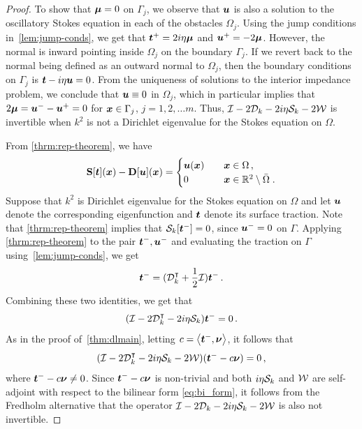 \begin{proof}
To show that ${\boldsymbol \mu}=0$ on
$\Gamma_{j}$, we observe that ${\boldsymbol u}$ is also a
solution to the oscillatory Stokes equation in each
of the obstacles $\Omega_{j}$.
Using the jump conditions in~\cref{lem:jump-conds},
we get that ${\boldsymbol t}^{+} = 2i\eta {\boldsymbol \mu}$ and ${\boldsymbol u}^{+} = -2{\boldsymbol \mu}$.
However, the normal is inward pointing inside $\Omega_{j}$
on the boundary $\Gamma_{j}$. 
If we revert back to the normal being defined as 
an outward normal to $\Omega_{j}$, then
the boundary conditions on $\Gamma_{j}$ 
is ${\boldsymbol t} - i \eta {\boldsymbol u} = 0$. 
From the uniqueness of solutions to the interior 
impedance problem, we conclude that ${\boldsymbol u} \equiv 0$
in $\Omega_{j}$, which in particular implies
that $2{\boldsymbol \mu} = {\boldsymbol u}^{-}-{\boldsymbol u}^{+} = 0$ for ${\boldsymbol x} \in \Gamma_{j}$,
$j=1,2,\ldots m$.
Thus, $\mathcal I - 2{\mathcal D}_{k} -2i\eta{\mathcal S}_{k} -2{\mathcal W}$ is
invertible when $k^2$ is not a Dirichlet eigenvalue
for the Stokes equation on $\Omega$.

From \cref{thrm:rep-theorem}, we have 
\begin{equation} 
  {\bf S} [{\boldsymbol t}]({\boldsymbol x}) - {\bf D}[{\boldsymbol u}]({\boldsymbol x}) = \begin{cases} 
    {\boldsymbol u}({\boldsymbol x}) &\quad {\boldsymbol x} \in \Omega \, , \\
    0 &\quad {\boldsymbol x} \in \mathbb{R}^2 \setminus \bar{\Omega} \; .
    \end{cases}
  \end{equation}
Suppose that $k^2$ is Dirichlet eigenvalue for
the Stokes equation on $\Omega$ and let ${\boldsymbol u}$
denote the corresponding eigenfunction and ${\boldsymbol t}$ denote
its surface traction. Note that \cref{thrm:rep-theorem}
implies that ${\mathcal S}_{k}[{\boldsymbol t}^{-}] = 0$, since
${\boldsymbol u}^{-}=0$ on $\Gamma$. Applying \cref{thrm:rep-theorem}
to the pair ${\boldsymbol t}^{-}, {\boldsymbol u}^{-}$ and evaluating the
traction on $\Gamma$ using~\cref{lem:jump-conds},
we get
\begin{equation}
{\boldsymbol t}^{-} = ({\mathcal D}^{\intercal}_{k} + \frac{1}{2} \mathcal I) {\boldsymbol t}^{-} \, . 
\end{equation}
Combining these two identities, we get
that
\begin{equation}
(\mathcal I - 2{\mathcal D}_{k}^{\intercal} -2i\eta {\mathcal S}_{k}) {\boldsymbol t}^{-} = 0 \, .
\end{equation}
As in the proof of~\cref{thm:dlmain}, letting
$c = \left< {\boldsymbol t}^{-} ,{\boldsymbol \nu} \right>$, it follows that
\begin{equation}
  (\mathcal I - 2{\mathcal D}_{k}^{\intercal} - 2i \eta {\mathcal S}_{k} - 2{\mathcal W})
  ({\boldsymbol t}^{-} - c{\boldsymbol \nu}) = 0 \, ,
\end{equation}
where ${\boldsymbol t}^{-} - c{\boldsymbol \nu} \neq 0$.
Since ${\boldsymbol t}^{-} - c{\boldsymbol \nu}$ is non-trivial and both
$i\eta {\mathcal S}_{k}$ and ${\mathcal W}$ are self-adjoint with respect
to the bilinear form \cref{eq:bi_form},
it follows from the Fredholm alternative
that the operator $\mathcal I - 2{\mathcal D}_{k} -2i\eta {\mathcal S}_k - 2{\mathcal W}$
is also not invertible.
\end{proof}

